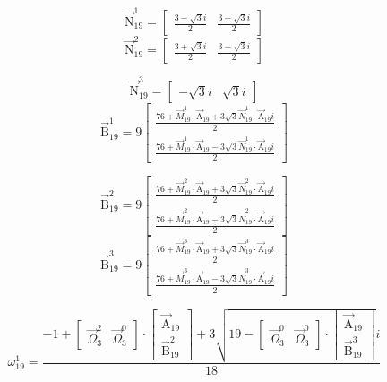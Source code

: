 \documentclass{article}
\begin{document}
\[ \vec{\mathrm{N}}_{19}^{1}=\left[ \begin{matrix} \frac{3-\sqrt{3}i}{2} & \frac{3+\sqrt{3}i}{2} \end{matrix} \right] \]
\[ \vec{\mathrm{N}}_{19}^{2}=\left[ \begin{matrix} \frac{3+\sqrt{3}i}{2} & \frac{3-\sqrt{3}i}{2} \end{matrix} \right] \]

\[ \vec{\mathrm{N}}_{19}^{3}=\left[ \begin{matrix} -\sqrt{3}i & \sqrt{3}i \end{matrix} \right] \]
\[ \vec{\mathrm{B}}_{19}^{1}=9\left[ \begin{matrix} \frac{76+\vec{M}_{19}^{1}\cdot\vec{\mathrm{A}}_{19}+3\sqrt{3}\vec{N}_{19}^{1}\cdot\vec{\mathrm{A}}_{19}i}{2} \\ \frac{76+\vec{M}_{19}^{1}\cdot\vec{\mathrm{A}}_{19}-3\sqrt{3}\vec{N}_{19}^{1}\cdot\vec{\mathrm{A}}_{19}i}{2} \end{matrix} \right] \]

\[ \vec{\mathrm{B}}_{19}^{2}=9\left[ \begin{matrix} \frac{76+\vec{M}_{19}^{2}\cdot\vec{\mathrm{A}}_{19}+3\sqrt{3}\vec{N}_{19}^{2}\cdot\vec{\mathrm{A}}_{19}i}{2} \\ \frac{76+\vec{M}_{19}^{2}\cdot\vec{\mathrm{A}}_{19}-3\sqrt{3}\vec{N}_{19}^{2}\cdot\vec{\mathrm{A}}_{19}i}{2} \end{matrix} \right] \]
\[ \vec{\mathrm{B}}_{19}^{3}=9\left[ \begin{matrix} \frac{76+\vec{M}_{19}^{3}\cdot\vec{\mathrm{A}}_{19}+3\sqrt{3}\vec{N}_{19}^{3}\cdot\vec{\mathrm{A}}_{19}i}{2} \\ \frac{76+\vec{M}_{19}^{3}\cdot\vec{\mathrm{A}}_{19}-3\sqrt{3}\vec{N}_{19}^{3}\cdot\vec{\mathrm{A}}_{19}i}{2} \end{matrix} \right] \]

\[ \omega_{19}^{1}=\frac{-1+\left[ \begin{matrix} \vec{\Omega}_{3}^{2} & \vec{\Omega}_{3}^{0} \end{matrix} \right]\cdot\left[ \begin{matrix} \vec{\mathrm{A}}_{19} \\ \vec{\mathrm{B}}_{19}^{2} \end{matrix} \right]+3\sqrt{19-\left[ \begin{matrix} \vec{\Omega}_{3}^{0} & \vec{\Omega}_{3}^{0} \end{matrix} \right]\cdot\left[ \begin{matrix} \vec{\mathrm{A}}_{19} \\ \vec{\mathrm{B}}_{19}^{3} \end{matrix} \right]}i}{18} \]
\end{document}
